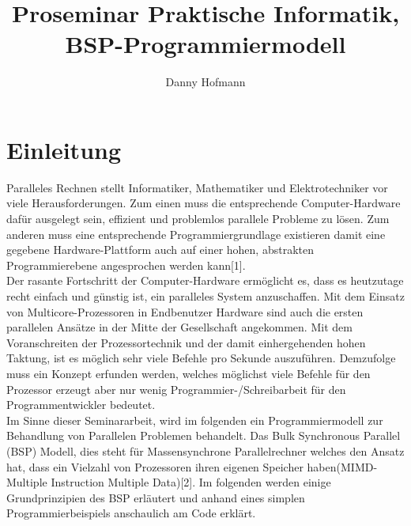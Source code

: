 \documentclass[a4paper,10pt]{scrartcl}
\title{Proseminar Praktische Informatik, BSP-Programmiermodell}
\author{Danny Hofmann}
\begin{document}
\tableofcontents
\newpage

\section{Einleitung}

Paralleles Rechnen stellt Informatiker, Mathematiker und Elektrotechniker vor viele Herausforderungen. Zum einen muss die entsprechende Computer-Hardware dafür ausgelegt sein, effizient und problemlos parallele Probleme zu lösen. Zum anderen muss eine entsprechende Programmiergrundlage existieren damit eine gegebene Hardware-Plattform auch auf einer hohen, abstrakten Programmierebene angesprochen werden kann[1].\\
Der rasante Fortschritt der Computer-Hardware ermöglicht es, dass es heutzutage recht einfach und günstig ist, ein paralleles System anzuschaffen. Mit dem Einsatz von Multicore-Prozessoren in Endbenutzer Hardware sind auch die ersten parallelen Ansätze in der Mitte der Gesellschaft angekommen. Mit dem Voranschreiten der Prozessortechnik und der damit einhergehenden hohen Taktung, ist es möglich sehr viele Befehle pro Sekunde auszuführen. Demzufolge muss ein Konzept erfunden werden, welches möglichst viele Befehle für den Prozessor erzeugt aber nur wenig Programmier-/Schreibarbeit für den Programmentwickler bedeutet.\\
Im Sinne dieser Seminararbeit, wird im folgenden ein Programmiermodell zur Behandlung von Parallelen Problemen behandelt. Das Bulk Synchronous Parallel (BSP) Modell, dies steht für Massensynchrone Parallelrechner welches den Ansatz hat, dass ein Vielzahl von Prozessoren ihren eigenen Speicher haben(MIMD-Multiple Instruction Multiple Data)[2]. Im folgenden werden einige Grundprinzipien des BSP erläutert und anhand eines simplen Programmierbeispiels anschaulich am Code erklärt.  
\end{document}
